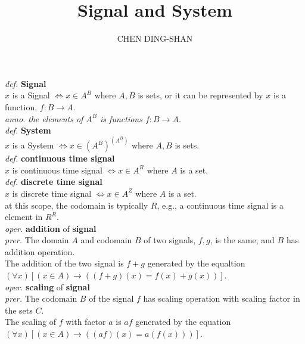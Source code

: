\documentclass{article}
\title{Signal and System}
\author{CHEN DING-SHAN}
\date{}
\newcommand{\sd}[1]{{\left(#1\right)}}
\newcommand{\df}[1]{\emph{def.} \textbf{#1}}
\newcommand{\anno}[1]{\emph{anno.} \emph{#1}}
\newcommand{\md}[1]{{\left[#1\right]}}
\newcommand{\prer}[1]{\emph{prer.} #1}
\newcommand{\oper}[2]{\emph{oper.} \textbf{#1} of \textbf{#2}}
\begin{document}
\maketitle
\noindent
\df{Signal}\\
$x$ is a Signal $\iff x \in A^B$ where $A, B$ is sets, or it can be represented by $x$ is a function, $f:B \to A$.\\
\anno{the elements of $A^B$ is functions $f:B \to A$}.\\
\df{System}\\
$x$ is a System $\iff x \in \sd{A^B}^\sd{A^B}$ where $A, B$ is sets.\\
\df{continuous time signal}\\
$x$ is continuous time signal $\iff x \in A^R$ where $A$ is a set.\\
\df{discrete time signal}\\
$x$ is discrete time signal $\iff x \in A^Z$ where $A$ is a set.\\
at this scope, the codomain is typically $R$, e.g., a continuous time signal is a element in $R^R$.\\
\oper{addition}{signal}\\
\prer{The domain $A$ and codomain $B$ of two signals, $f,g$, is the same, and $B$ has addition operation.}\\
The addition of the two signal is $f+g$ generated by the equaltion $\sd{\forall x}\md{\sd{x \in A} \to \sd{\sd{f+g}\sd{x} = f\sd{x} + g\sd{x}}}$.\\
\oper{scaling}{signal}\\
\prer{The codomain $B$ of the signal $f$ has scaling operation with scaling factor in the sets $C$.}\\
The scaling of $f$ with factor $a$ is $af$ generated by the equation $\sd{\forall x}\md{\sd{x \in A} \to \sd{\sd{af}\sd{x} = a\sd{f\sd{x}}}}$.\\
\end{document}
